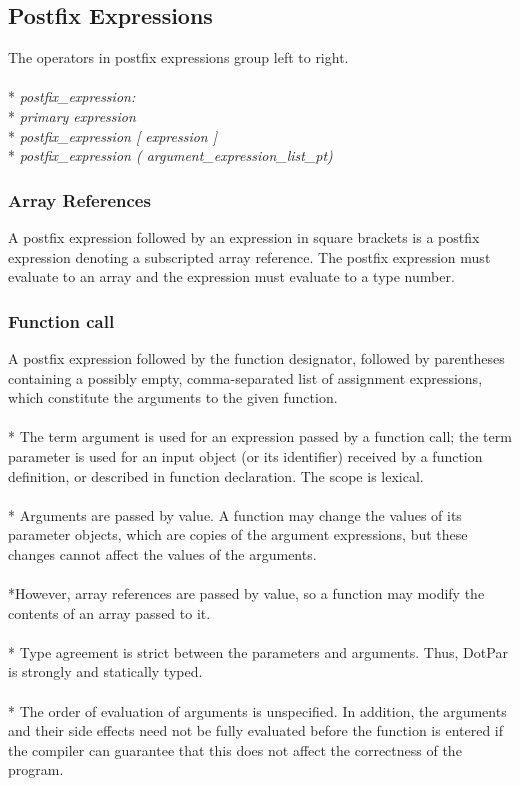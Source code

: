 \subsection{Postfix Expressions}
The operators in postfix expressions group left to right.
\\ \\* \tab \emph{postfix\_expression:}
\\* \tab \tab \emph{primary expression}
\\* \tab \tab \emph{postfix\_expression [ expression ]}
\\* \tab \tab \emph{postfix\_expression ( argument\_expression\_list\_pt)}
\subsubsection{Array References}
A postfix expression followed by an expression in square brackets is a postfix expression denoting a subscripted array reference. The postfix expression must evaluate to an array and the expression must evaluate to a type number.
\subsubsection{Function call}
A postfix expression followed by the function designator, followed by parentheses containing a possibly empty, comma-separated list of assignment expressions, which constitute the arguments to the given function.   
\\ \\* The term argument is used for an expression passed by a function call; the term parameter is used for an input object (or its identifier) received by a function definition, or described in function declaration. The scope is lexical.
\\ \\* Arguments are passed by value. A function may change the values of its parameter objects, which are copies of the argument expressions, but these changes cannot affect the values of the arguments. 
\\ \\*However, array references are passed by value, so a function may modify the contents of an array passed to it. 
\\ \\* Type agreement is strict between the parameters and arguments. Thus, DotPar is strongly and statically typed.          
\\ \\* The order of evaluation of arguments is unspecified. In addition, the arguments and their side effects need not be fully evaluated before the function is entered if the compiler can guarantee that this does not affect the correctness of the program. 

